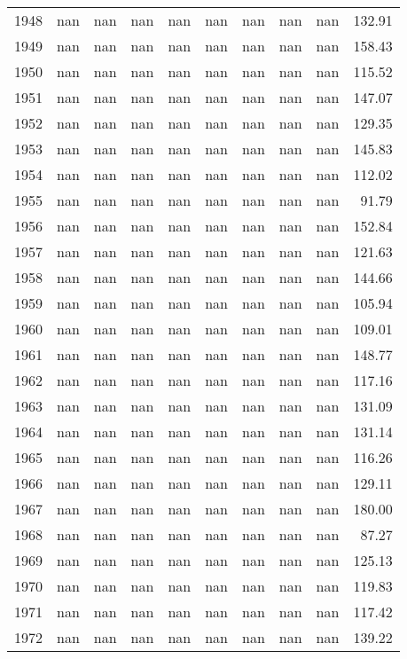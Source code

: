 \begin{tabular}{lrrrrrrrrr}
1948 & nan & nan & nan & nan & nan & nan & nan & nan & 132.91 \\
1949 & nan & nan & nan & nan & nan & nan & nan & nan & 158.43 \\
1950 & nan & nan & nan & nan & nan & nan & nan & nan & 115.52 \\
1951 & nan & nan & nan & nan & nan & nan & nan & nan & 147.07 \\
1952 & nan & nan & nan & nan & nan & nan & nan & nan & 129.35 \\
1953 & nan & nan & nan & nan & nan & nan & nan & nan & 145.83 \\
1954 & nan & nan & nan & nan & nan & nan & nan & nan & 112.02 \\
1955 & nan & nan & nan & nan & nan & nan & nan & nan & 91.79 \\
1956 & nan & nan & nan & nan & nan & nan & nan & nan & 152.84 \\
1957 & nan & nan & nan & nan & nan & nan & nan & nan & 121.63 \\
1958 & nan & nan & nan & nan & nan & nan & nan & nan & 144.66 \\
1959 & nan & nan & nan & nan & nan & nan & nan & nan & 105.94 \\
1960 & nan & nan & nan & nan & nan & nan & nan & nan & 109.01 \\
1961 & nan & nan & nan & nan & nan & nan & nan & nan & 148.77 \\
1962 & nan & nan & nan & nan & nan & nan & nan & nan & 117.16 \\
1963 & nan & nan & nan & nan & nan & nan & nan & nan & 131.09 \\
1964 & nan & nan & nan & nan & nan & nan & nan & nan & 131.14 \\
1965 & nan & nan & nan & nan & nan & nan & nan & nan & 116.26 \\
1966 & nan & nan & nan & nan & nan & nan & nan & nan & 129.11 \\
1967 & nan & nan & nan & nan & nan & nan & nan & nan & 180.00 \\
1968 & nan & nan & nan & nan & nan & nan & nan & nan & 87.27 \\
1969 & nan & nan & nan & nan & nan & nan & nan & nan & 125.13 \\
1970 & nan & nan & nan & nan & nan & nan & nan & nan & 119.83 \\
1971 & nan & nan & nan & nan & nan & nan & nan & nan & 117.42 \\
1972 & nan & nan & nan & nan & nan & nan & nan & nan & 139.22 \\

\end{tabular}

